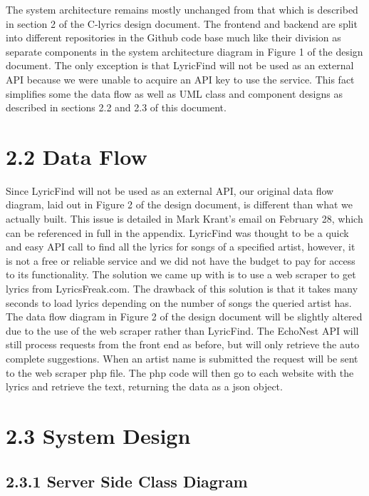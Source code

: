 \documentclass[]{article}
\begin{document}
The system architecture remains mostly unchanged from that which is
described in section 2 of the C-lyrics design document. The frontend and
backend are split into different repositories in the Github code base
much like their division as separate components in the system
architecture diagram in Figure 1 of the design document. The only
exception is that LyricFind will not be used as an external API because
we were unable to acquire an API key to use the service. This fact
simplifies some the data flow as well as UML class and component designs
as described in sections 2.2 and 2.3 of this document.

\section{\textbf{2.2 Data Flow}}\label{data-flow}

Since LyricFind will not be used as an external API, our original data
flow diagram, laid out in Figure 2 of the design document, is different
than what we actually built. This issue is detailed in Mark Krant's
email on February 28, which can be referenced in full in the appendix.
LyricFind was thought to be a quick and easy API call to find all the
lyrics for songs of a specified artist, however, it is not a free or
reliable service and we did not have the budget to pay for access to its
functionality. The solution we came up with is to use a web scraper to
get lyrics from LyricsFreak.com. The drawback of this solution is that
it takes many seconds to load lyrics depending on the number of songs
the queried artist has. The data flow diagram in Figure 2 of the design
document will be slightly altered due to the use of the web scraper
rather than LyricFind. The EchoNest API will still process requests from
the front end as before, but will only retrieve the auto complete
suggestions. When an artist name is submitted the request will be sent
to the web scraper php file. The php code will then go to each website
with the lyrics and retrieve the text, returning the data as a json
object.

\section{\textbf{2.3 System Design}}\label{system-design}

\subsection{\textbf{2.3.1 Server Side Class
Diagram}}\label{server-side-class-diagram}
\end{document}
